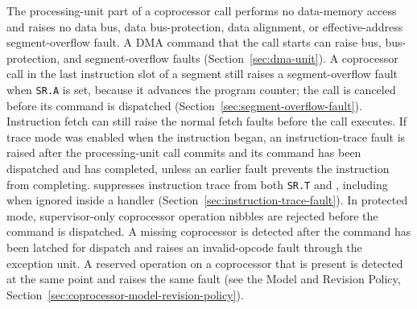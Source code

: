 \noindent The processing-unit part of a coprocessor call performs no data-memory access and raises no data bus, data
bus-protection, data alignment, or effective-address segment-overflow fault. A DMA command that the call starts can raise
bus, bus-protection, and segment-overflow faults (Section~\ref{sec:dma-unit}). A coprocessor call in the last
instruction slot of a segment still raises a segment-overflow fault when \texttt{SR.A} is set, because it advances the
program counter; the call is canceled before its command is dispatched (Section~\ref{sec:segment-overflow-fault}). Instruction fetch can still raise the normal fetch faults before the call executes. If trace mode was
enabled when the instruction began, an instruction-trace fault is raised after the processing-unit call commits and
its command has been dispatched and has completed, unless an earlier fault prevents the instruction from completing.
 suppresses instruction trace from both \texttt{SR.T} and , including when ignored
inside a handler (Section~\ref{sec:instruction-trace-fault}). In protected mode, supervisor-only coprocessor
operation nibbles are rejected before the command is dispatched. A missing coprocessor is detected after the command
has been latched for dispatch and raises an invalid-opcode fault through the exception unit. A reserved operation on a coprocessor that is present is detected at the same point and raises the same fault (see the Model and
Revision Policy, Section~\ref{sec:coprocessor-model-revision-policy}).

